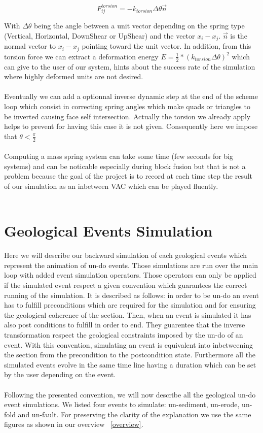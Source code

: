 \documentclass[12pt, a4paper]{report} %
\begin{document}
\begin{equation}
F_{ij}^{torsion} = -k_{torsion}\Delta \theta \vec{n}
\end{equation}

With $\Delta \theta$ being the angle between a unit vector depending on the spring type (Vertical, Horizontal, DownShear or UpShear) and the vector $x_i - x_j$. $\vec{n}$ is the normal vector to $x_i - x_j$ pointing toward the unit vector. In addition, from this torsion force we can extract a deformation energy $ E = \frac{1}{2}*(k_{torsion}\Delta \theta)^2$ which can give to the user of our system, hints about the success rate of the simulation where highly deformed units are not desired.\\\\
Eventually we can add a optionnal inverse dynamic step at the end of the scheme loop which consist in correcting spring angles which make quads or triangles to be inverted causing face self intersection. Actually the torsion we already apply helps to prevent for having this case it is not given. Consequently here we impose that $\theta < \frac{\pi}{2}$ 
\\\\
Computing a mass spring system can take some time (few seconds for big systems) and can be noticable especially during block fusion but that is not a problem because the goal of the project is to record at each time step the result of our simulation as an inbetween VAC which can be played fluently.\\\\

\section{Geological Events Simulation}
\label{sec:geoevsim}
Here we will describe our backward simulation of each geological events which represent the animation of un-do events. Those simulations are run over the main loop with added event simulation operators. Those operators can only be applied if the simulated event respect a given convention which guarantees the correct running of the simulation. It is described as follows: in order to be un-do an event has to fulfill preconditions which are required for the simulation and for ensuring the geological coherence of the section. Then, when an event is simulated it has also post conditions to fulfill in order to end. They guarentee that the inverse transformation respect the geological constraints imposed by the un-do of an event. With this convention, simulating an event is equivalent into inbetweening the section from the precondition to the postcondition state. Furthermore all the simulated events evolve in the same time line having a duration which can be set by the user depending on the event.\\\\
Following the presented convention, we will now describe all the geological un-do event simulations. We listed four events to simulate: un-sediment, un-erode, un-fold and un-fault. For preserving the clarity of the explanation we use the same figures as shown in our overview ~\ref{overview}.
\end{document}
